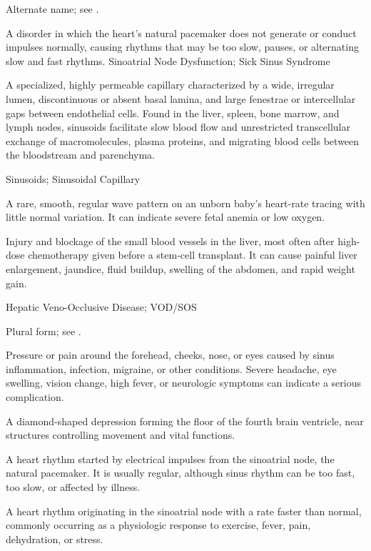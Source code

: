  Alternate name; see .

 A disorder in which the heart's natural pacemaker does not generate or conduct impulses normally, causing rhythms that may be too slow, pauses, or alternating slow and fast rhythms.
\synonyms
Sinoatrial Node Dysfunction; Sick Sinus Syndrome

 A specialized, highly permeable capillary characterized by a wide, irregular lumen, discontinuous or absent basal lamina, and large fenestrae or intercellular gaps between endothelial cells. Found in the liver, spleen, bone marrow, and lymph nodes, sinusoids facilitate slow blood flow and unrestricted transcellular exchange of macromolecules, plasma proteins, and migrating blood cells between the bloodstream and parenchyma.

\synonyms
Sinusoids; Sinusoidal Capillary

 A rare, smooth, regular wave pattern on an unborn baby’s heart-rate tracing with little normal variation. It can indicate severe fetal anemia or low oxygen.

 Injury and blockage of the small blood vessels in the liver, most often after high-dose chemotherapy given before a stem-cell transplant. It can cause painful liver enlargement, jaundice, fluid buildup, swelling of the abdomen, and rapid weight gain.

\synonyms
Hepatic Veno-Occlusive Disease; VOD/SOS

 Plural form; see .

 Pressure or pain around the forehead, cheeks, nose, or eyes caused by sinus inflammation, infection, migraine,
or other conditions. Severe headache, eye swelling, vision change, high fever, or neurologic
symptoms can indicate a serious complication.

 A diamond-shaped depression forming the floor of the fourth brain ventricle, near structures controlling movement and vital functions.

 A heart rhythm started by electrical impulses from the sinoatrial node, the natural pacemaker. It is usually regular, although sinus rhythm can be too fast, too slow, or affected by illness.

 A heart rhythm originating in the sinoatrial node with a rate faster than normal, commonly occurring as a physiologic response to exercise, fever, pain, dehydration, or stress.

